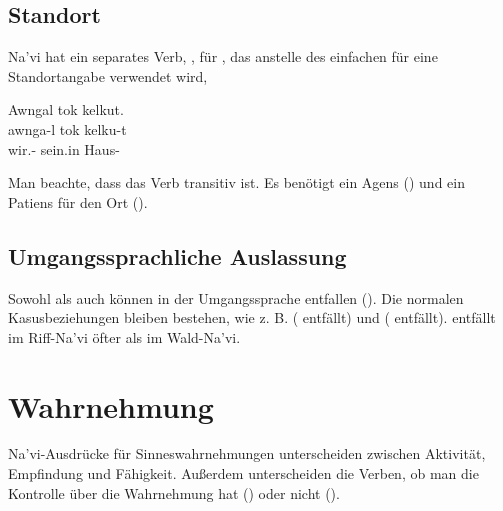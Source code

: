 \subsection{Standort} Na'vi hat ein separates Verb, , für , das anstelle des einfachen  für eine Standortangabe verwendet wird,

\begin{interlin}
  \glll Awngal tok kelkut. \\
  awnga-l tok kelku-t \\
  wir.- sein.in Haus- \\
  \Ipawl{}
\end{interlin}

\noindent Man beachte, dass das Verb  transitiv ist. Es benötigt ein Agens () und ein Patiens für den Ort ().

\subsection{Umgangssprachliche Auslassung}
Sowohl  als auch  können in der Umgangssprache entfallen (). Die normalen Kasusbeziehungen bleiben bestehen, wie z. B.   ( entfällt) und   ( entfällt).  entfällt im Riff-Na'vi öfter als im Wald-Na'vi.

\section{Wahrnehmung} 
Na'vi-Ausdrücke für Sinneswahrnehmungen unterscheiden zwischen Aktivität, Empfindung und Fähigkeit. Außerdem unterscheiden die Verben, ob man die Kontrolle über die Wahrnehmung hat () oder nicht ().

